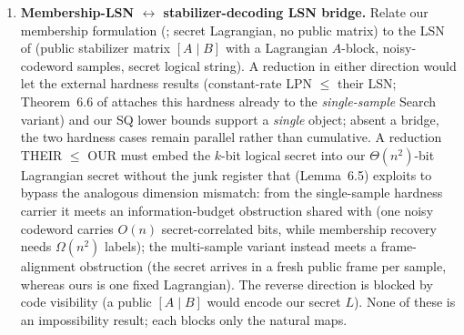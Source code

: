 \documentclass[11pt,a4paper]{article}
\theoremstyle{plain}
\theoremstyle{definition}
\begin{document}
\begin{enumerate}
\item \textbf{Membership-LSN $\leftrightarrow$ stabilizer-decoding LSN bridge.} Relate our membership formulation (; secret Lagrangian, no public matrix) to the LSN of \cite{KLP+25,LPQR26} (public stabilizer matrix $[A \mid B]$ with a Lagrangian $A$-block, noisy-codeword samples, secret logical string). A reduction in either direction would let the external hardness results (constant-rate LPN $\le$ their LSN; Theorem~6.6 of \cite{KLP+25} attaches this hardness already to the \emph{single-sample} Search variant) and our SQ lower bounds support a \emph{single} object; absent a bridge, the two hardness cases remain parallel rather than cumulative. A reduction THEIR $\le$ OUR must embed the $k$-bit logical secret into our $\Theta(n^2)$-bit Lagrangian secret without the junk register that \cite{KLP+25} (Lemma~6.5) exploits to bypass the analogous dimension mismatch: from the single-sample hardness carrier it meets an information-budget obstruction shared with  (one noisy codeword carries $O(n)$ secret-correlated bits, while membership recovery needs $\Omega(n^2)$ labels); the multi-sample variant instead meets a frame-alignment obstruction (the secret arrives in a fresh public frame per sample, whereas ours is one fixed Lagrangian). The reverse direction is blocked by code visibility (a public $[A \mid B]$ would encode our secret $L$). None of these is an impossibility result; each blocks only the natural maps.


\end{enumerate}
\end{document}
